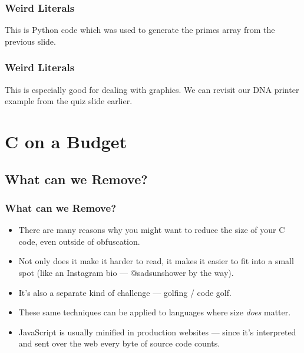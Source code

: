 \documentclass[handout,xcolor]{beamer}
\begin{document}
\begin{frame}
	\frametitle{Weird Literals}
	
	This is Python code which was used to generate the primes array from the previous slide.
	
	
\end{frame}

\begin{frame}
	\frametitle{Weird Literals}
	\pause
	
	This is especially good for dealing with graphics. We can revisit our DNA printer example from the quiz slide earlier.
	\pause
	
	
\end{frame}

\section{C on a Budget}

\subsection{What can we Remove?}

\begin{frame}
	\frametitle{What can we Remove?}
	\pause
	
	\begin{itemize}
		\item There are many reasons why you might want to reduce the size of your C code, even outside of obfuscation.
		\pause
		
		\item Not only does it make it harder to read, it makes it easier to fit into a small spot (like an Instagram bio --- @sadsunshower by the way).
		\pause
		
		\item It's also a separate kind of challenge --- golfing / code golf.
		\pause
		
		\item These same techniques can be applied to languages where size \textit{does} matter.
		\pause
		
		\item JavaScript is usually minified in production websites \pause --- since it's interpreted and sent over the web every byte of source code counts.
	\end{itemize}
\end{frame}
\end{document}
